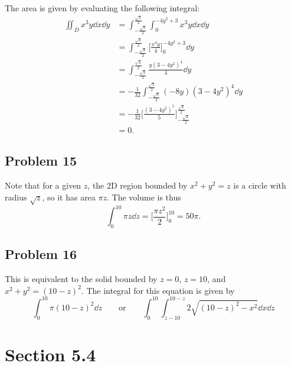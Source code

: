\documentclass[11pt]{article}
\begin{document}
The area is given by evaluating the following integral:
\begin{align*}
	\iint_{D} x^{3}y \dd{x} \dd{y} &= \int_{-\frac{\sqrt{3}}{2}}^{\frac{\sqrt{3}}{3}} \int_{0}^{-4y^{2} + 3} x^{3}y \dd{x} \dd{y} \\
	&= \int_{-\frac{\sqrt{3}}{2}}^{\frac{\sqrt{3}}{2}} \Big[ \frac{x^{4}y}{4} \Big]_{0}^{-4y^{2} + 3} \dd{y} \\
	&= \int_{-\frac{\sqrt{3}}{2}}^{\frac{\sqrt{3}}{2}} \frac{y(3-4y^{2})^{4}}{4} \dd{y} \\
	&= -\frac{1}{32} \int_{-\frac{\sqrt{3}}{2}}^{\frac{\sqrt{3}}{2}} (-8y)(3 - 4y^{2})^{4} \dd{y} \\
	&= -\frac{1}{32} \Big[ \frac{(3 - 4y^{2})^{5}}{5} \Big]_{-\frac{\sqrt{3}}{2}}^{\frac{\sqrt{3}}{2}} \\
	&= \boxed{0}.
\end{align*}


\subsection*{Problem 15}

Note that for a given $z$, the 2D region bounded by $x^{2} + y^{2} = z$ is a circle with radius $\sqrt{z}$, so it has area $\pi z$. The volume is thus
\[
	\int_{0}^{10} \pi z \dd{z} = \Big[ \frac{\pi z^{2}}{2} \Big]_{0}^{10} = \boxed{50\pi}.
\]


\subsection*{Problem 16}

This is equivalent to the solid bounded by $z = 0$, $z = 10$, and $x^{2} + y^{2} = (10 - z)^{2}$. The integral for this equation is given by
\[
	\boxed{\int_{0}^{10} \pi (10 - z)^{2} \dd{z}} \qquad \text{or} \qquad \boxed{\int_{0}^{10} \int_{z - 10}^{10 - z} 2\sqrt{(10 - z)^{2} - x^{2}} \dd{x} \dd{z}}
\]


\section{Section 5.4}

\end{document}
